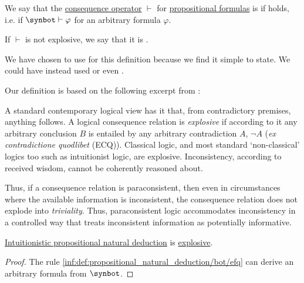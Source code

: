 \begin{definition}\label{def:paraconsistent_consequence_operator}
  We say that the \hyperref[def:consequence_operator]{consequence operator} \( \vdash \) for \hyperref[def:propositional_formula]{propositional formulas} is  if  holds, i.e. if \( \synbot \vdash \varphi \) for an arbitrary formula \( \varphi \).

  If \( \vdash \) is not explosive, we say that it is .
\end{definition}
\begin{comments}
  \item We have chosen to use  for this definition because we find it simple to state. We could have instead used  or even .

  \item Our definition is based on the following excerpt from \cite{StanfordPlato:paraconsistent_logic}:
  \begin{displayquote}
    A standard contemporary logical view has it that, from contradictory premises, anything follows. A logical consequence relation is \textit{explosive} if according to it any arbitrary conclusion \( B \) is entailed by any arbitrary contradiction \( A \), \( \neg A \) (\textit{ex contradictione quodlibet} (ECQ)). Classical logic, and most standard \enquote*{non-classical} logics too such as intuitionist logic, are explosive. Inconsistency, according to received wisdom, cannot be coherently reasoned about.

    Thus, if a consequence relation is paraconsistent, then even in circumstances where the available information is inconsistent, the consequence relation does not explode into \textit{triviality}. Thus, paraconsistent logic accommodates inconsistency in a controlled way that treats inconsistent information as potentially informative.
  \end{displayquote}
\end{comments}

\begin{proposition}\label{thm:intuitionistic_natural_deduction_is_explosive}
  \hyperref[def:propositional_natural_deduction]{Intuitionistic propositional natural deduction} is \hyperref[def:paraconsistent_consequence_operator]{explosive}.
\end{proposition}
\begin{proof}
  The rule \ref{inf:def:propositional_natural_deduction/bot/efq} can derive an arbitrary formula from \( \synbot \).
\end{proof}

